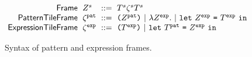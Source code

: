 \begin{figure}
  \vspace{-3px}
  \[
  \arraycolsep=3pt\begin{array}{rlrl}
      \mathsf{Frame} & \tframe^s & ::= & \tiles^s\tfrelem^s\tiles^s \\
      \mathsf{PatternTileFrame} & \tfrelem^{\pat} & ::= &
        \sparen{\tframe^{\pat}} ~\vert~
        \slam{\tframe^{\expr}}{} ~\vert~
        \slet{\tframe^{\expr}}{\tiles^{\expr}}{} \\
      \mathsf{ExpressionTileFrame} & \tfrelem^{\expr} & ::= &
        \sparen{\tiles^{\expr}} ~\vert~
        \slet{\tiles^{\pat}}{\tframe^{\expr}}{}
  \end{array}\]
  \caption{
    Syntax of pattern and expression frames.
  }
  \label{fig:tile-syntax}
\end{figure}
